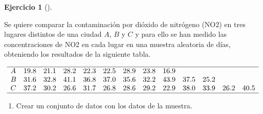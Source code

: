 \documentclass[
  a4paper,
]{scrreport}
\theoremstyle{definition}
\newtheorem{exercise}{Ejercicio}[chapter]
\theoremstyle{remark}
\begin{document}
\begin{exercise}[]\protect\hypertarget{exr-anova-un-factor-contaminacion}{}\label{exr-anova-un-factor-contaminacion}

Se quiere comparar la contaminación por dióxido de nitrógeno (NO2) en
tres lugares distintos de una ciudad \(A\), \(B\) y \(C\) y para ello se
han medido las concentraciones de NO2 en cada lugar en una muestra
aleatoria de días, obteniendo los resultados de la siguiente tabla.

\[
\begin{array}{lrrrrrrrrrrrr}
\hline
A & 19.8 & 21.1 & 28.2 & 22.3 & 22.5 & 28.9 & 23.8 & 16.9 \\
B & 31.6 & 32.8 & 41.1 & 36.8 & 37.0 & 35.6 & 32.2 & 43.9 & 37.5 & 25.2 \\
C & 37.2 & 30.2 & 26.6 & 31.7 & 26.8 & 28.6 & 29.2 & 22.9 & 38.0 & 33.9 & 26.2 & 40.5 \\
\hline
\end{array}
\]

\begin{enumerate}
\def\labelenumi{\alph{enumi}.}
\item
  Crear un conjunto de datos con los datos de la muestra.

  \begin{tcolorbox}[enhanced jigsaw, colframe=quarto-callout-tip-color-frame, toprule=.15mm, bottomtitle=1mm, breakable, opacitybacktitle=0.6, toptitle=1mm, colback=white, bottomrule=.15mm, title=\textcolor{quarto-callout-tip-color}{\faLightbulb}\hspace{0.5em}{Solución}, arc=.35mm, left=2mm, titlerule=0mm, rightrule=.15mm, coltitle=black, leftrule=.75mm, opacityback=0, colbacktitle=quarto-callout-tip-color!10!white]


\end{tcolorbox}
\end{enumerate}
\end{exercise}
\end{document}
